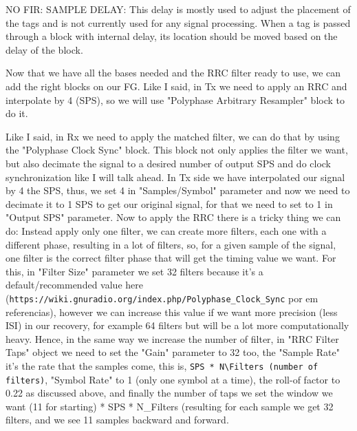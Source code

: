 \documentclass[a4paper, 10pt, conference]{ieeeconf}      %
\begin{document}
    NO FIR: SAMPLE DELAY: This delay is mostly used to adjust the placement of the tags and is not currently used for any signal processing. When a tag is passed through a block with internal delay, its location should be moved based on the delay of the block.
    
    
    
    Now that we have all the bases needed and the RRC filter ready to use, we can add the right blocks on our FG. Like I said, in Tx we need to apply an RRC and interpolate by 4 (SPS), so we will use "Polyphase Arbitrary Resampler" block to do it. 
    
    Like I said, in Rx we need to apply the matched filter, we can do that by using the "Polyphase Clock Sync" block. This block not only applies the filter we want, but also decimate the signal to a desired number of output SPS and do clock synchronization like I will talk ahead. In Tx side we have interpolated our signal by 4 the SPS, thus, we set 4 in "Samples/Symbol" parameter and now we need to decimate it to 1 SPS to get our original signal, for that we need to set to 1 in "Output SPS" parameter. Now to apply the RRC there is a tricky thing we can do: Instead apply only one filter, we can create more filters, each one with a different phase, resulting in a lot of filters, so, for a given sample of the signal, one filter is the correct filter phase that will get the timing value we want. For this, in "Filter Size" parameter we set 32 filters because it's a default/recommended value here (\verb|https://wiki.gnuradio.org/index.php/Polyphase_Clock_Sync| por em referencias), however we can increase this value if we want more precision (less ISI) in our recovery, for example 64 filters but will be a lot more computationally heavy. Hence, in the same way we increase the number of filter, in "RRC Filter Taps" object we need to set the "Gain" parameter to 32 too, the "Sample Rate" it's the rate that the samples come, this is, \verb|SPS * N\Filters (number of filters)|, "Symbol Rate" to 1 (only one symbol at a time), the roll-of factor to 0.22 as discussed above, and finally the number of taps we set the window we want (11 for starting) * SPS * N\_Filters (resulting for each sample we get 32 filters, and we see 11 samples backward and forward. 
    
\end{document}
